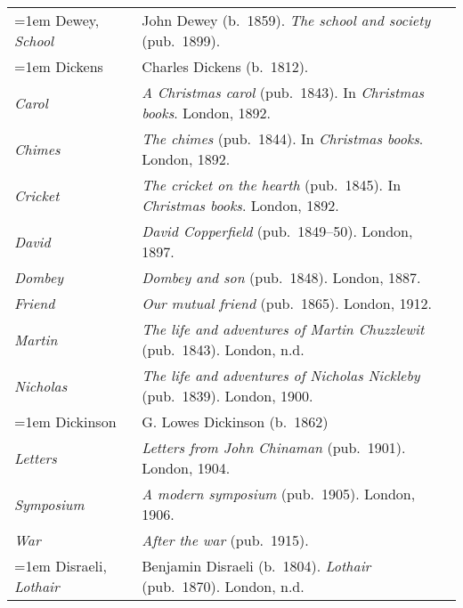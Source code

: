\begin{xltabular}{\textwidth}{ lQ }
\hangindent=1em  Dewey, \textit{School} & John Dewey (b.~1859). \textit{The school and society} (pub.~1899). \\

\hangindent=1em  Dickens & Charles Dickens (b.~1812). \\
\hspace{1em}\textit{Carol} & \textit{A Christmas carol} (pub.~1843). In \textit{Christmas books}. London, 1892. \\ %
\hspace{1em}\textit{Chimes} & \textit{The chimes} (pub.~1844). In \textit{Christmas books}. London, 1892. \\ %
\hspace{1em}\textit{Cricket} & \textit{The cricket on the hearth} (pub.~1845). In \textit{Christmas books}. London, 1892. \\
\hspace{1em}\textit{David} & \textit{David Copperfield} (pub.~1849--50). London, 1897. \\
\hspace{1em}\textit{Dombey} & \textit{Dombey and son} (pub.~1848). London, 1887. \\
\hspace{1em}\textit{Friend} & \textit{Our mutual friend} (pub.~1865). London, 1912. \\
\hspace{1em}\textit{Martin} & \textit{The life and adventures of Martin Chuzzlewit} (pub.~1843). London, n.d. \\
\hspace{1em}\textit{Nicholas} & \textit{The life and adventures of Nicholas Nickleby} (pub.~1839). London, 1900. \\

\hangindent=1em  Dickinson & G. Lowes Dickinson (b.~1862) \\
\hspace{1em}\textit{Letters} & \textit{Letters from John Chinaman} (pub.~1901). London, 1904. \\
\hspace{1em}\textit{Symposium} & \textit{A modern symposium} (pub.~1905). London, 1906. \\
\hspace{1em}\textit{War} & \textit{After the war} (pub.~1915). \\

\hangindent=1em  Disraeli, \textit{Lothair} & Benjamin Disraeli (b.~1804). \textit{Lothair} (pub.~1870). London, n.d. \\ %


\end{xltabular}
